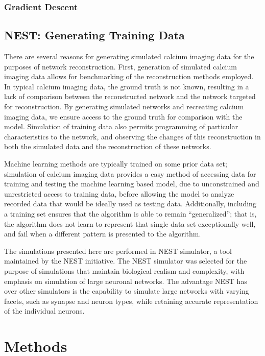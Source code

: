 \documentclass[11pt]{article}
\begin{document}
\subsubsection{Gradient Descent}


\subsection{NEST: Generating Training Data}
There are several reasons for generating simulated calcium imaging data for the purposes of network reconstruction. First, generation of simulated calcium imaging data allows for benchmarking of the reconstruction methods employed. In typical calcium imaging data, the ground truth is not known, resulting in a lack of comparison between the reconstructed network and the network targeted for reconstruction. By generating simulated networks and recreating calcium imaging data, we ensure access to the ground truth for comparison with the model. Simulation of training data also permits programming of particular characteristics to the network, and observing the changes of this reconstruction in both the simulated data and the reconstruction of these networks.\par
Machine learning methods are typically trained on some prior data set; simulation of calcium imaging data provides a easy method of accessing data for training and testing the machine learning based model, due to unconstrained and unrestricted access to training data, before allowing the model to analyze recorded data that would be ideally used as testing data. Additionally, including a training set ensures that the algorithm is able to remain “generalized”; that is, the algorithm does not learn to represent that single data set exceptionally well, and fail when a different pattern is presented to the algorithm.\par
The simulations presented here are performed in NEST simulator, a tool maintained by the NEST initiative. The NEST simulator was selected for the purpose of simulations that maintain biological realism and complexity, with emphasis on simulation of large neuronal networks. The advantage NEST has over other simulators is the capability to simulate large networks with varying facets, such as synapse and neuron types, while retaining accurate representation of the individual neurons.\par

\section{Methods}
\end{document}
